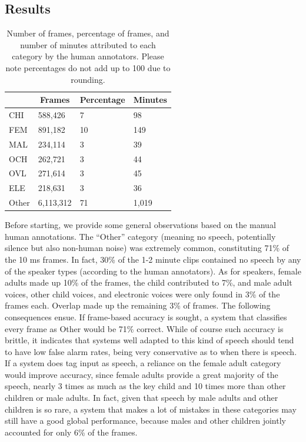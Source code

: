 \documentclass[english,table,man,floatsintext]{apa6}
\begin{document}
\hypertarget{results}{%
\subsection{Results}\label{results}}

\begin{table}[tbp]

\begin{center}
\begin{threeparttable}

\caption{\label{tab:tabprops}Number of frames, percentage of frames, and number of minutes attributed to each category by the human annotators. Please note percentages do not add up to 100 due to rounding.}

\begin{tabular}{llll}
\toprule
 & \multicolumn{1}{c}{Frames} & \multicolumn{1}{c}{Percentage} & \multicolumn{1}{c}{Minutes}\\
\midrule
CHI & 588,426 & 7 & 98\\
FEM & 891,182 & 10 & 149\\
MAL & 234,114 & 3 & 39\\
OCH & 262,721 & 3 & 44\\
OVL & 271,614 & 3 & 45\\
ELE & 218,631 & 3 & 36\\
Other & 6,113,312 & 71 & 1,019\\
\bottomrule
\end{tabular}

\end{threeparttable}
\end{center}

\end{table}

Before starting, we provide some general observations based on the manual human annotations. The \enquote{Other} category (meaning no speech, potentially silence but also non-human noise) was extremely common, constituting 71\% of the 10 ms frames. In fact, 30\% of the 1-2 minute clips contained no speech by any of the speaker types (according to the human annotators). As for speakers, female adults made up 10\% of the frames, the child contributed to 7\%, and male adult voices, other child voices, and electronic voices were only found in 3\% of the frames each. Overlap made up the remaining 3\% of frames. The following consequences ensue. If frame-based accuracy is sought, a system that classifies every frame as Other would be 71\% correct. While of course such accuracy is brittle, it indicates that systems well adapted to this kind of speech should tend to have low false alarm rates, being very conservative as to when there is speech. If a system does tag input as speech, a reliance on the female adult category would improve accuracy, since female adults provide a great majority of the speech, nearly 3 times as much as the key child and 10 times more than other children or male adults. In fact, given that speech by male adults and other children is so rare, a system that makes a lot of mistakes in these categories may still have a good global performance, because males and other children jointly accounted for only 6\% of the frames.
\end{document}
